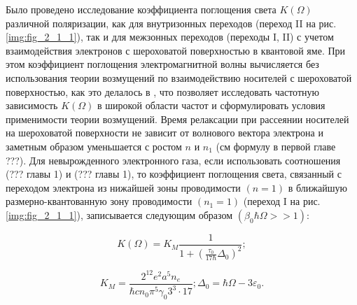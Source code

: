 {Было проведено исследование коэффициента поглощения света $K\left(\Omega \right)$ различной поляризации, как для внутризонных переходов (переход II на рис. \ref{img:fig_2_1_1}), так и для межзонных переходов (переходы I, II) с учетом взаимодействия электронов с шероховатой поверхностью в квантовой яме. При этом коэффициент поглощения электромагнитной волны вычисляется без использования теории возмущений по взаимодействию носителей с шероховатой поверхностью, как это делалось в \cite{Vurgaftman1999}, что позволяет исследовать частотную зависимость $K(\Omega)$ в широкой области частот и сформулировать условия применимости теории возмущений.
Время релаксации при рассеянии носителей на шероховатой поверхности не зависит от волнового вектора электрона и заметным образом уменьшается с ростом $n$ и $n_1$ (см формулу в первой главе ???). Для невырожденного электронного газа, если использовать соотношения (??? главы 1) и (??? главы 1), то коэффициент поглощения света, связанный с переходом электрона из нижайшей зоны проводимости $(n=1)$ в ближайшую размерно-квантованную зону проводимости $(n_1=1)$ (переход I на рис. \ref{img:fig_2_1_1}), записывается следующим образом $(\beta _0\hbar \Omega >>1)$:

\begin{equation} \label{eq:21_10}
K \left(\Omega \right)=K_{M} \frac{1}{1+\left(\frac{\tau _{0} }{17\hbar } \Delta _{0} \right)^{2} } ;
\end{equation} 

\[
K_{M} =\frac{2^{12} e^{2} a^{5} n_{e} }{\hbar cn_{0} \pi ^{5} \gamma _{0} 3^{3} \cdot 17} ; \Delta _{0} =\hbar \Omega -3\varepsilon _{0}.
\]

}
